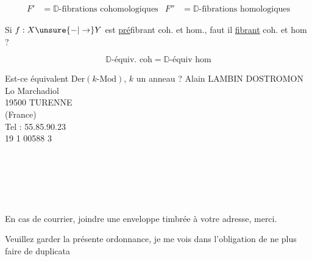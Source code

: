 

\[\begin{aligned}F'&=\mathbb D\text{-fibrations cohomologiques}& F''&=\mathbb D\text{-fibrations homologiques}\end{aligned}\]

Si $f:X\unsure{\mathord{-}|\to}Y$ est \uline{pré}fibrant coh. et hom.,  faut il \uline{fibrant} coh. et hom ?

\[\mathbb D\text{-équiv. coh}=\mathbb D\text{-équiv hom}\]


Est-ce équivalent  $\mathrm{Der}(k\text{-}\mathrm{Mod})$, $k$ un anneau ?
Alain LAMBIN DOSTROMON\\
Lo Marchadiol\\
19500 TURENNE\\
(France)\\
Tel : 55.85.90.23\\
19 1 00588 3\\

\\


\\
\\
\\

\\

En cas de courrier, joindre une enveloppe timbrée à votre adresse, merci.

Veuillez garder la présente ordonnance, je me vois dans l'obligation de ne plus faire de duplicata

